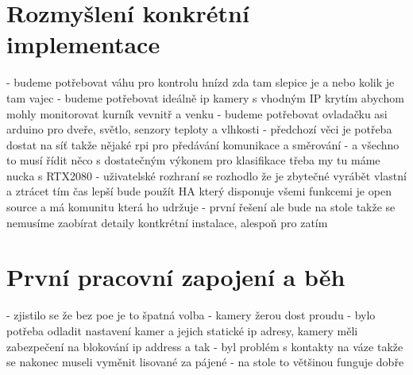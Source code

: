 \section{Rozmyšlení konkrétní implementace}
- budeme potřebovat váhu pro kontrolu hnízd zda tam slepice je a nebo kolik je tam vajec\newline
- budeme potřebovat ideálně ip kamery s vhodným IP krytím abychom mohly monitorovat kurník vevnitř a venku\newline
- budeme potřebovat ovladačku asi arduino pro dveře, světlo, senzory teploty a vlhkosti\newline
- předchozí věci je potřeba dostat na síť takže nějaké rpi pro předávání komunikace a směrování\newline
- a všechno to musí řídit něco s dostatečným výkonem pro klasifikace třeba my tu máme nucka s RTX2080\newline
- uživatelské rozhraní se rozhodlo že je zbytečné vyrábět vlastní a ztrácet tím čas lepší bude použít HA který disponuje všemi funkcemi je open source a má komunitu která ho udržuje
- první řešení ale bude na stole takže se nemusíme zaobírat detaily kontkrétní instalace, alespoň pro zatím


\section{První pracovní zapojení a běh}
- zjistilo se že bez poe je to špatná volba \newline
- kamery žerou dost proudu\newline
- bylo potřeba odladit nastavení kamer a jejich statické ip adresy, kamery měli zabezpečení na blokování ip address a tak\newline
- byl problém s kontakty na váze takže se nakonec museli vyměnit lisované za pájené\newline
- na stole to většinou funguje dobře \newline


